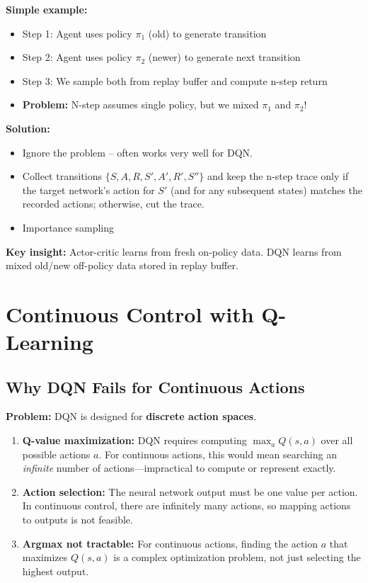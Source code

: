\documentclass[12pt]{article}
\begin{document}
\textbf{Simple example:} 
\begin{itemize}
    \item Step 1: Agent uses policy $\pi_1$ (old) to generate transition
    \item Step 2: Agent uses policy $\pi_2$ (newer) to generate next transition  
    \item Step 3: We sample both from replay buffer and compute n-step return
    \item \textbf{Problem:} N-step assumes single policy, but we mixed $\pi_1$ and $\pi_2$!
\end{itemize}

\textbf{Solution:} 
\begin{itemize}
    \item Ignore the problem – often works very well for DQN.
    \item Collect transitions $\{S, A, R, S', A', R', S''\}$ and keep the n-step trace only if the target network’s action for $S'$ (and for any subsequent states) matches the recorded actions; otherwise, cut the trace.
    \item Importance sampling
\end{itemize}

\textbf{Key insight:} Actor-critic learns from fresh on-policy data. DQN learns from mixed old/new off-policy data stored in replay buffer.


\section{Continuous Control with Q-Learning }

\subsection{Why DQN Fails for Continuous Actions}

\textbf{Problem:} DQN is designed for \textbf{discrete action spaces}.

\begin{enumerate}
    \item \textbf{Q-value maximization:} DQN requires computing $\max_a Q(s, a)$ over all possible actions $a$. For continuous actions, this would mean searching an \emph{infinite} number of actions—impractical to compute or represent exactly.

    \item \textbf{Action selection:} The neural network output must be one value per action. In continuous control, there are infinitely many actions, so mapping actions to outputs is not feasible.

    \item \textbf{Argmax not tractable:} For continuous actions, finding the action $a$ that maximizes $Q(s, a)$ is a complex optimization problem, not just selecting the highest output.
\end{enumerate}
\end{document}
